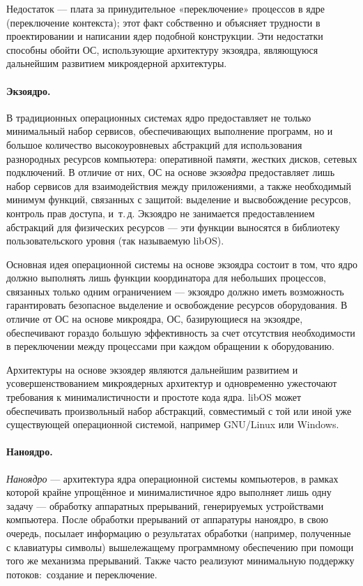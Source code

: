 Недостаток --- плата за принудительное «переключение» процессов в ядре (переключение контекста); этот факт собственно и объясняет трудности в проектировании и написании ядер подобной конструкции. Эти недостатки способны обойти ОС, использующие архитектуру экзоядра, являющуюся дальнейшим развитием микроядерной архитектуры.

\paragraph{Экзоядро.} В традиционных операционных системах ядро предоставляет не только минимальный набор сервисов, обеспечивающих выполнение программ, но и большое количество высокоуровневых абстракций для использования разнородных ресурсов компьютера: оперативной памяти, жестких дисков, сетевых подключений. В отличие от них, ОС на основе \emph{экзоядра} предоставляет лишь набор сервисов для взаимодействия между приложениями, а также необходимый минимум функций, связанных с защитой: выделение и высвобождение ресурсов, контроль прав доступа, и~т.\,д. Экзоядро не занимается предоставлением абстракций для физических ресурсов --- эти функции выносятся в библиотеку пользовательского уровня (так называемую libOS).

Основная идея операционной системы на основе экзоядра состоит в том, что ядро должно выполнять лишь функции координатора для небольших процессов, связанных только одним ограничением --- экзоядро должно иметь возможность гарантировать безопасное выделение и освобождение ресурсов оборудования. В отличие от ОС на основе микроядра, ОС, базирующиеся на экзоядре, обеспечивают гораздо большую эффективность за счет отсутствия необходимости в переключении между процессами при каждом обращении к оборудованию.

Архитектуры на основе экзоядер являются дальнейшим развитием и усовершенствованием микроядерных архитектур и одновременно ужесточают требования к минималистичности и простоте кода ядра. libOS может обеспечивать произвольный набор абстракций, совместимый с той или иной уже существующей операционной системой, например GNU/Linux или Windows.

\paragraph{Наноядро.} \emph{Наноядро} --- архитектура ядра операционной системы компьютеров, в рамках которой крайне упрощённое и минималистичное ядро выполняет лишь одну задачу --- обработку аппаратных прерываний, генерируемых устройствами компьютера. После обработки прерываний от аппаратуры наноядро, в свою очередь, посылает информацию о результатах обработки (например, полученные с клавиатуры символы) вышележащему программному обеспечению при помощи того же механизма прерываний. Также часто реализуют минимальную поддержку потоков:~создание и переключение.

